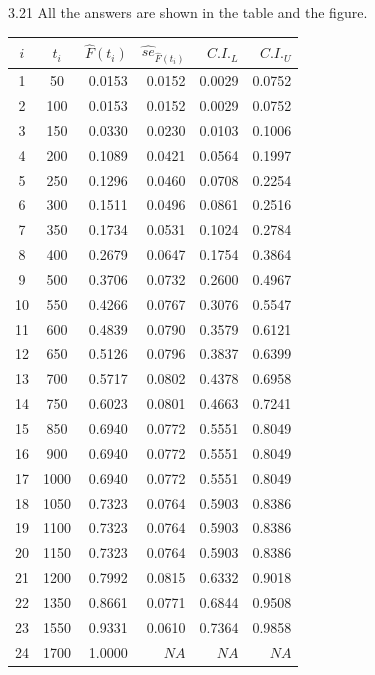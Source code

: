 \documentclass[paper=a4, fontsize=11pt]{scrartcl} %
\numberwithin{equation}{section} %
\numberwithin{figure}{section} %
\numberwithin{table}{section} %
\begin{document}
\newpage
3.21 \qquad All the answers are shown in the table and the figure.
		\begin{table}[h]
			\begin{center}
			\begin{tabular}{ccrrrr}
				$i$  	& 	$t_i$ 	&  	$\widehat{F}(t_i)$ & 
				$\widehat{se}_{\widehat{F}(t_i)}$  & $C.I._L$ & $C.I._U$ \\ \hline
 1   & 50     &0.0153    &0.0152 &0.0029 &0.0752 \\
 2   &100    &0.0153    &0.0152 &0.0029 &0.0752 \\
 3   &150    &0.0330    &0.0230 &0.0103 &0.1006 \\
 4   &200    &0.1089    &0.0421 &0.0564 &0.1997 \\
 5   &250    &0.1296    &0.0460 &0.0708 &0.2254 \\
 6   &300    &0.1511    &0.0496 &0.0861 &0.2516 \\
 7   &350    &0.1734    &0.0531 &0.1024 &0.2784 \\
 8   &400    &0.2679    &0.0647 &0.1754 &0.3864 \\
 9   &500    &0.3706    &0.0732 &0.2600 &0.4967 \\
10  &550    &0.4266    &0.0767 &0.3076 &0.5547 \\
11  &600    &0.4839    &0.0790 &0.3579 &0.6121 \\
12  &650    &0.5126    &0.0796 &0.3837 &0.6399 \\
13  &700    &0.5717    &0.0802 &0.4378 &0.6958 \\
14  &750    &0.6023    &0.0801 &0.4663 &0.7241 \\
15  &850    &0.6940    &0.0772 &0.5551 &0.8049 \\
16  &900    &0.6940    &0.0772 &0.5551 &0.8049 \\
17  &1000  &0.6940    &0.0772 &0.5551 &0.8049 \\
18  &1050  &0.7323    &0.0764 &0.5903 &0.8386 \\
19  &1100  &0.7323    &0.0764 &0.5903 &0.8386 \\
20  &1150  &0.7323    &0.0764 &0.5903 &0.8386 \\
21  &1200  &0.7992    &0.0815 &0.6332 &0.9018 \\
22  &1350  &0.8661    &0.0771 &0.6844 &0.9508 \\
23  &1550  &0.9331    &0.0610 &0.7364 &0.9858 \\
24  &1700  &1.0000    &$NA$   &$NA$   & $NA$   
			\end{tabular}
			\end{center}
		\end{table}
\end{document}
